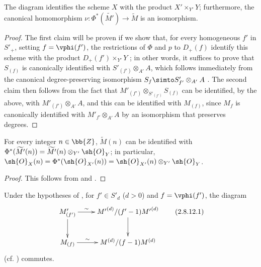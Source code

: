 \begin{proposition}[2.8.10]
\label{II.2.8.10}
The diagram  identifies the scheme $X$ with the product $X'\times_{Y'}Y$;
furthermore, the canonical homomorphism $\nu:\Phi^*(\widetilde{M'})\to\widetilde{M}$  is an isomorphism.
\end{proposition}

\begin{proof}
The first claim will be proven if we show that, for every homogeneous $f'$ in $S'_+$, setting $f=\vphi(f')$, the restrictions of $\Phi$ and $p$ to $D_+(f)$ identify this scheme with the product $D_+(f')\times_{Y'}Y$ ;
in other words, it suffices  to prove that $S_{(f)}$ is canonically identified with $S'_{(f')}\otimes_{A'}A$, which follows immediately from the canonical degree-preserving isomorphism $S_f\simto S'_{f'}\otimes_{A'}A$ .
The second claim then follows from the fact that $M'_{(f')}\otimes_{S'_{(f')}}S_{(f)}$ can be identified, by the above, with $M'_{(f')}\otimes_{A'}A$, and this can be identified with $M_{(f)}$, since $M_f$ is canonically identified with $M'_{f'}\otimes_{A'}A$ by an isomorphism that preserves degrees.
\end{proof}

\begin{corollary}[2.8.11]
\label{II.2.8.11}
For every integer $n\in\bb{Z}$, $\widetilde{M}(n)$ can be identified with $\Phi^*(\widetilde{M'}(n))=\widetilde{M'}(n)\otimes_{Y'}\sh{O}_Y$;
in particular, $\sh{O}_X(n)=\Phi^*(\sh{O}_{X'}(n))=\sh{O}_{X'}(n)\otimes_{Y'}\sh{O}_Y$.
\end{corollary}

\begin{proof}
This follows from  and .
\end{proof}


\begin{env}[2.8.12]
\label{II.2.8.12}
Under the hypotheses of , for $f'\in S'_d$ ($d>0$) and $f=\vphi(f')$, the diagram
\[
\label{II.2.8.12.1}
  \xymatrix{
    M'_{(f')} \ar[r]^-{\sim} \ar[d]
    & {M'}^{(d)}/(f'-1){M'}^{(d)} \ar[d]
  \\M_{(f)} \ar[r]^-{\sim}
    & M^{(d)}/(f-1)M^{(d)}
  }
  \tag{2.8.12.1}
\]
(cf. ) commutes.
\end{env}

